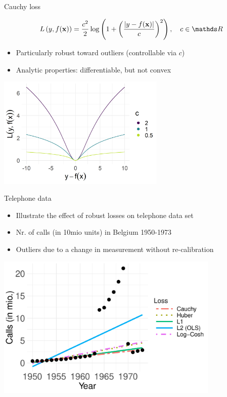 \documentclass[11pt,compress,t,notes=noshow, xcolor=table]{beamer}
\begin{document}
\begin{vbframe}{Cauchy loss}


$$
\Lxy = \frac{c^2}{2} \log \left( 1 + \left( \frac{\left|y - \fx\right|}{c}\right)^2 \right), 
\quad c \in \R
$$

\begin{itemize}
\item Particularly robust toward outliers (controllable via $c$)
\item Analytic properties: differentiable, but not convex
\end{itemize}

\vfill

\begin{center}
\includegraphics[width = 0.6\textwidth]{figure/loss_cauchy.png}
\end{center}

\end{vbframe}

\begin{vbframe}{Telephone data}

\begin{itemize}

\item Illustrate the effect of robust losses on telephone data set 
\item Nr. of calls (in 10mio units) in Belgium 1950-1973
\item Outliers due to a change in measurement without re-calibration 

\end{itemize}

\vfill

\begin{center}
\includegraphics[width = 0.8\textwidth]{figure/telephone-data.pdf}
\end{center}

\end{vbframe}
\end{document}
